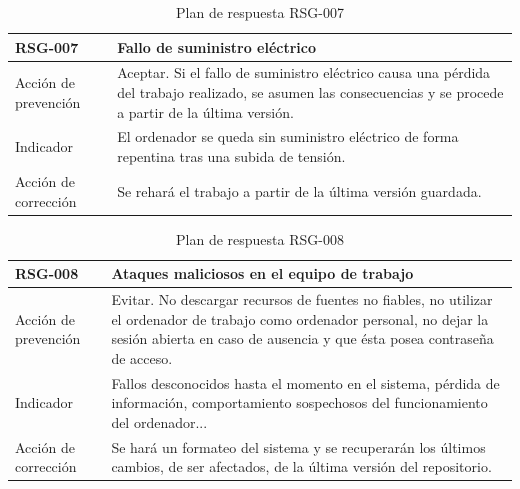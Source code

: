 \begin{table}[htpb]
\centering
\caption{Plan de respuesta RSG-007}
\begin{tabularx}{\textwidth}{|l|X|}
\hline
RSG-007              & Fallo de suministro eléctrico                                                                                                                                 \\ \hline
Acción de prevención & Aceptar. Si el fallo de suministro eléctrico causa una pérdida del trabajo realizado, se asumen las consecuencias y se procede a partir de la última versión. \\ \hline
Indicador            & El ordenador se queda sin suministro eléctrico de forma repentina tras una subida de tensión.                                                                 \\ \hline
Acción de corrección & Se rehará el trabajo a partir de la última versión guardada.                                                                                                  \\ \hline
\end{tabularx}
\end{table}


\begin{table}[htpb]
\centering
\caption{Plan de respuesta RSG-008}
\begin{tabularx}{\textwidth}{|X|l|}
\hline
RSG-008              & Ataques maliciosos en el equipo de trabajo                                                                                                                                                              \\ \hline
Acción de prevención & Evitar. No descargar recursos de fuentes no fiables, no utilizar el ordenador de trabajo como ordenador personal, no dejar la sesión abierta en caso de ausencia y que ésta posea contraseña de acceso. \\ \hline
Indicador            & Fallos desconocidos hasta el momento en el sistema, pérdida de información, comportamiento sospechosos del funcionamiento del ordenador...                                                              \\ \hline
Acción de corrección & Se hará un formateo del sistema y se recuperarán los últimos cambios, de ser afectados, de la última versión del repositorio.                                                                           \\ \hline
\end{tabularx}
\end{table}






